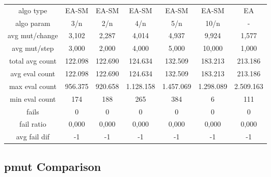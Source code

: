 \begin{tabular}[h]{ccccccc}
algo type&            EA-SM&     EA-SM&     EA-SM&     EA-SM&     EA-SM&        EA\\
algo param&             3/n&       2/n&       4/n&       5/n&      10/n&         -\\
avg mut/change&       3,102&     2,287&     4,014&     4,937&     9,924&     1,577\\
avg mut/step&         3,000&     2,000&     4,000&     5,000&    10,000&     1,000\\
\hline
total avg count&    122.098&   122.690&   124.634&   132.509&   183.213&   213.186\\
avg eval count&     122.098&   122.690&   124.634&   132.509&   183.213&   213.186\\
max eval count&     956.375&   920.658& 1.128.158& 1.457.069& 1.298.089& 2.509.163\\
min eval count&         174&       188&       265&       384&         6&       111\\
\hline
fails&                    0&         0&         0&         0&         0&         0\\
fail ratio&           0,000&     0,000&     0,000&     0,000&     0,000&     0,000\\
avg fail dif&            -1&        -1&        -1&        -1&        -1&        -1\\
\end{tabular}


\subsection{pmut Comparison}


